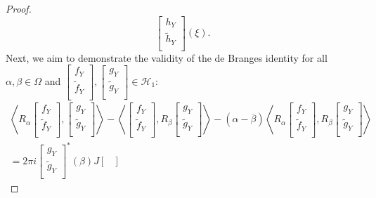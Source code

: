 \documentclass[10pt,a4paper]{amsart}
\begin{document}
\begin{proof}
$$\begin{bmatrix}
    h_Y  \\
    \tilde{h}_Y \\
    \end{bmatrix} (\xi).$$
Next, we aim to demonstrate the validity of the de Branges identity for all $\alpha, \beta \in \Omega$ and $\begin{bmatrix} 
f_Y  \\
\tilde{f}_Y \\
\end{bmatrix},  \begin{bmatrix} 
g_Y  \\
\tilde{g}_Y \\
\end{bmatrix} \in \mathcal{H}_1$: \begin{multline} \label{Equation 3.21}
\left\langle R_\alpha  \begin{bmatrix} 
	f_Y  \\
	\tilde{f}_Y\\
	\end{bmatrix},  \begin{bmatrix} 
	g_Y  \\
	\tilde{g}_Y \\
	\end{bmatrix} \right\rangle  -\left\langle  \begin{bmatrix} 
	f_Y  \\
	\tilde{f}_Y \\
	\end{bmatrix}, R_{\beta} \begin{bmatrix} 
	g_Y  \\
	\tilde{g}_Y \\
	\end{bmatrix} \right\rangle - (\alpha- \overline{\beta}) \left\langle R_{\alpha}\begin{bmatrix} 
	f_Y  \\
	\tilde{f}_Y \\
	\end{bmatrix},  R_{\beta}\begin{bmatrix} 
	g_Y  \\
	\tilde{g}_Y \\
	\end{bmatrix} \right\rangle 
	\\
	= 2\pi i \begin{bmatrix} 
	g_Y  \\
	\tilde{g}_Y \\
	\end{bmatrix}^*(\beta) J \begin{bmatrix} 

\end{bmatrix}
\end{multline}
\end{proof}
\end{document}
